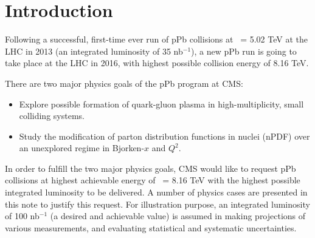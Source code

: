 \section*{Introduction}

Following a successful, first-time ever run of pPb collisions 
at \rootsNN\ = 5.02 TeV at the LHC in 2013 (an integrated luminosity 
of 35 nb$^{-1}$), a new pPb run is going to take place at the 
LHC in 2016, with highest possible collision energy of 8.16 TeV.

There are two major physics goals of the pPb program at CMS:

\begin{itemize}
\item Explore possible formation of quark-gluon plasma in high-multiplicity, small colliding systems. 
\item Study the modification of parton distribution functions in nuclei (nPDF) over 
an unexplored regime in Bjorken-$x$ and $Q^{2}$. 
\end{itemize}

In order to fulfill the two major physics goals, 
CMS would like to request pPb collisions at highest achievable 
energy of \rootsNN\ = 8.16 TeV with the highest possible integrated 
luminosity to be delivered. A number of physics cases are presented 
in this note to justify this request. For illustration purpose, 
an integrated luminosity of 100 nb$^{-1}$ (a desired and achievable value) 
is assumed in making projections of various measurements,
and evaluating statistical and systematic uncertainties.